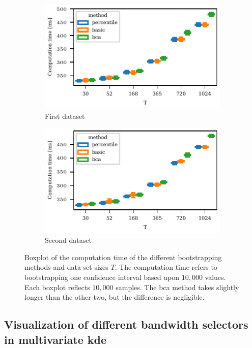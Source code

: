 \documentclass[pdflatex]{sn-jnl}
\theoremstyle{plain}%
\theoremstyle{definition}
\begin{document}
\begin{figure}
    \centering
    \begin{subfigure}{0.48\textwidth}
\includegraphics{plots/illustrative_examples/boxplot_comp_time_butterfly}
        \caption{First dataset}
    \end{subfigure}
    \begin{subfigure}{0.48\textwidth}
    \includegraphics{plots/illustrative_examples/boxplot_comp_time_normal}
        \caption{Second dataset}
    \end{subfigure}
    \caption[Boxplot of the computation time of the different bootstrapping methods and data set sizes $T$.]{Boxplot of the computation time of the different bootstrapping methods and data set sizes $T$. The computation time refers to bootstrapping one confidence interval based upon $10,000$ values. Each boxplot reflects $10,000$ samples. The \ac{bca} method takes slightly longer than the other two, but the difference is negligible.}
    \label{fig:trending_bootstrap_time}
\end{figure}


\subsection{Visualization of different bandwidth selectors in multivariate \ac{kde}}\label{subsec:appendix-kde}
\end{document}

